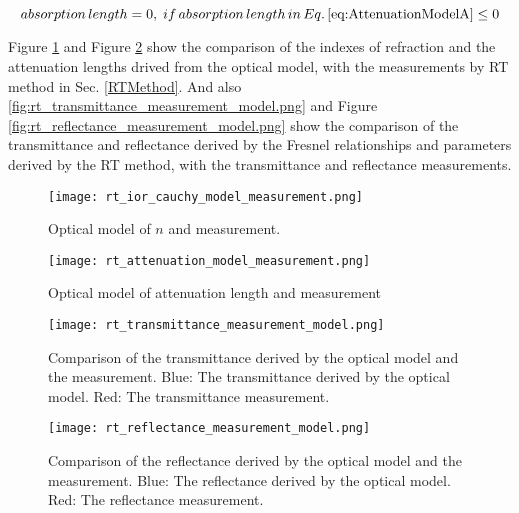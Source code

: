 \begin{equation}
\label{eq:AttenuationModelB}
absorption\,length = 0,\;if\,absorption\,length\,in\,Eq.\,\ref{eq:AttenuationModelA}\leq0
\end{equation}


Figure \ref{fig:rt_ior_cauchy_model_measurement.png} and Figure \ref{fig:rt_attenuation_model_measurement.png} show the comparison of the indexes of refraction and the attenuation lengths drived from the
optical model, with the measurements by RT method in Sec. \ref{RTMethod}.
And also \ref{fig:rt_transmittance_measurement_model.png} and Figure \ref{fig:rt_reflectance_measurement_model.png} show the comparison of the transmittance
and reflectance derived by the Fresnel relationships and parameters derived by the RT method, with the transmittance and reflectance measurements.




\begin{figure}
    \centering
    \texttt{[image: rt\_ior\_cauchy\_model\_measurement.png]}
    \caption[Optical model of $n$ and measurement]{Optical model of $n$ and measurement.}
    \label{fig:rt_ior_cauchy_model_measurement.png}
    \end{figure}



\begin{figure}
    \centering
    \texttt{[image: rt\_attenuation\_model\_measurement.png]}
    \caption[Optical model of attenuation length and measurement]{Optical model of attenuation length and measurement}
    \label{fig:rt_attenuation_model_measurement.png}
    \end{figure}


\begin{figure}
    \centering
    \texttt{[image: rt\_transmittance\_measurement\_model.png]}
    \caption[Comparison of the transmittance derived by the optical model and the measurement]
{
Comparison of the transmittance derived by the optical model and the measurement.
Blue: The transmittance derived by the optical model.
Red: The transmittance measurement.
}
    \label{fig:fig:rt_transmittance_measurement_model.png}
    \end{figure}


\begin{figure}
    \centering
    \texttt{[image: rt\_reflectance\_measurement\_model.png]}
    \caption[Comparison of the reflectance derived by the optical model and the measurement.]
{
Comparison of the reflectance derived by the optical model and the measurement.
Blue: The reflectance derived by the optical model.
Red: The reflectance measurement.
}
    \label{}
    \end{figure}



